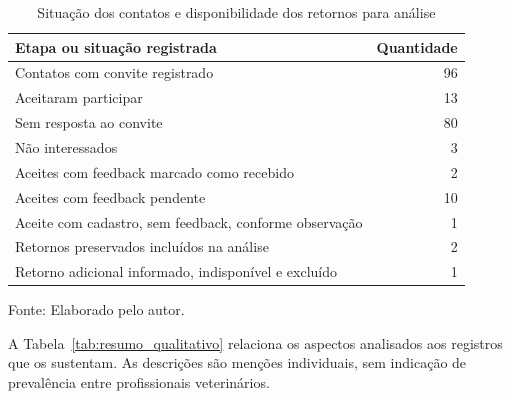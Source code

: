 \documentclass{UNESC}
\begin{document}
\begin{table}[htbp]
\centering
\caption{Situação dos contatos e disponibilidade dos retornos para análise}
\label{tab:recrutamento}
\small
\setlength{\tabcolsep}{5pt}
\renewcommand{\arraystretch}{1.1}
\begin{tabular}{@{}p{} r@{}}
\hline
\textbf{Etapa ou situação registrada} & \textbf{Quantidade} \\
\hline
Contatos com convite registrado & 96 \\
Aceitaram participar & 13 \\
Sem resposta ao convite & 80 \\
Não interessados & 3 \\
Aceites com feedback marcado como recebido & 2 \\
Aceites com feedback pendente & 10 \\
Aceite com cadastro, sem feedback, conforme observação & 1 \\
Retornos preservados incluídos na análise & 2 \\
Retorno adicional informado, indisponível e excluído & 1 \\
\hline
\end{tabular}
\par\vspace{2pt}
{\footnotesize\raggedright Fonte: Elaborado pelo autor.\par}
\end{table}

A Tabela~\ref{tab:resumo_qualitativo} relaciona os aspectos analisados aos registros que os sustentam. As descrições são menções individuais, sem indicação de prevalência entre profissionais veterinários.
\end{document}
